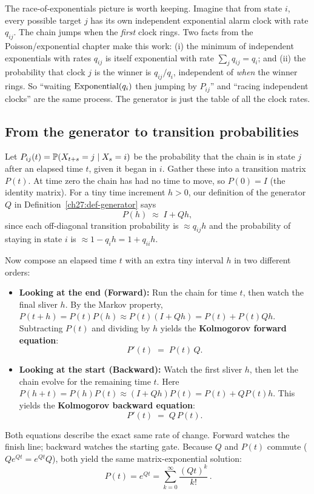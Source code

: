 \begin{connectionbox}
The race-of-exponentials picture is worth keeping. Imagine that from state $i$, every possible
target $j$ has its own independent exponential alarm clock with rate $q_{ij}$. The chain jumps when
the \emph{first} clock rings. Two facts from the Poisson/exponential chapter make this work: (i) the
minimum of independent exponentials with rates $q_{ij}$ is itself exponential with rate
$\sum_j q_{ij} = q_i$; and (ii) the probability that clock $j$ is the winner is
$q_{ij}/q_i$, independent of \emph{when} the winner rings. So ``waiting $\operatorname{Exponential}(q_i)$ then jumping by
$P_{ij}$'' and ``racing independent clocks'' are the same process. The generator is just the table of
all the clock rates.
\end{connectionbox}

\subsection{From the generator to transition probabilities}

Let $P_{ij}(t) = \operatorname{\mathbb{P}}(X_{t+s} = j \mid X_s = i)$ be the probability that the chain is in state $j$
after an elapsed time $t$, given it began in $i$. Gather these into a transition matrix $P(t)$.
At time zero the chain has had no time to move, so $P(0) = I$ (the identity matrix). For a tiny time
increment $h > 0$, our definition of the generator $Q$ in Definition~\ref{ch27:def-generator} says
\[
  P(h) \;\approx\; I + Q h,
\]
since each off-diagonal transition probability is $\approx q_{ij}h$ and the probability of staying in
state $i$ is $\approx 1 - q_i h = 1 + q_{ii}h$.

Now compose an elapsed time $t$ with an extra tiny interval $h$ in two different orders:
\begin{itemize}
  \item \textbf{Looking at the end (Forward):} Run the chain for time $t$, then watch the final
  sliver $h$. By the Markov property, $P(t+h) = P(t)P(h) \approx P(t)(I + Qh) = P(t) + P(t)Qh$.
  Subtracting $P(t)$ and dividing by $h$ yields the \textbf{Kolmogorov forward equation}:
  \[
    P'(t) \;=\; P(t)\,Q.
  \]
  \item \textbf{Looking at the start (Backward):} Watch the first sliver $h$, then let the chain
  evolve for the remaining time $t$. Here $P(h+t) = P(h)P(t) \approx (I + Qh)P(t) = P(t) + QP(t)h$.
  This yields the \textbf{Kolmogorov backward equation}:
  \[
    P'(t) \;=\; Q\,P(t).
  \]
\end{itemize}
Both equations describe the exact same rate of change. Forward watches the finish line; backward
watches the starting gate. Because $Q$ and $P(t)$ commute ($Qe^{Qt} = e^{Qt}Q$), both yield the
same matrix-exponential solution:
\[
  \boxed{\,P(t) = e^{Qt} = \sum_{k=0}^{\infty} \frac{(Qt)^k}{k!}\,.}
\]

